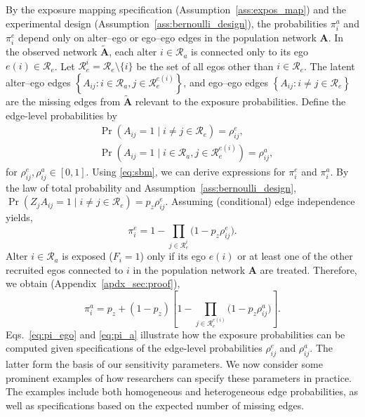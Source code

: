 \documentclass[11pt]{article}
\theoremstyle{definition}
\def \bA {\boldsymbol{A}}
\def \cR {\mathcal{R}}
\begin{document}
By the exposure mapping specification (Assumption~\ref{ass:expos_map}) and 
the experimental design (Assumption~\ref{ass:bernoulli_design}),
the probabilities $\pi_i^a$ and $\pi_i^e$ depend 
only on alter--ego or ego--ego edges in the population network $\bA$.
In the observed network $\widetilde{\bA}$, each alter $i \in \cR_a$ is connected only to its ego $e(i) \in \cR_e$.
Let $\cR_e^{i} = \cR_e \setminus \{i\}$ be the set of all egos other than $i \in \cR_e$.
The latent alter--ego edges $\left\{A_{ij} : i \in \cR_a, j \in \cR_e^{e(i)} \right\}$,
and ego--ego edges $\left\{A_{ij}: i \neq j \in \cR_e\right\}$ 
    are the missing edges from $\widetilde{\bA}$
    relevant to the exposure probabilities.
Define the edge-level probabilities by
\begin{equation}
    \label{eq:sbm}
    \begin{aligned}
    &\Pr\left(A_{ij}=1 \mid i \neq j \in\cR_e\right) = \rho^e_{ij},
    \\ 
    &\Pr\left(A_{ij}=1 \mid i \in \cR_a, j \in \cR_e^{e(i)} \right) = \rho^a_{ij},
    \end{aligned}
\end{equation}
for $\rho^e_{ij}, \rho^a_{ij} \in [0,1]$.
Using \eqref{eq:sbm}, we can derive expressions for $\pi^e_i$ and $\pi^a_i$.
By the law of total probability and Assumption~\ref{ass:bernoulli_design},
 $\Pr\left(Z_jA_{ij} = 1 \mid i\neq j \in \cR_e\right) =
    p_z\rho^e_{ij}$.
Assuming (conditional) edge independence yields,
\begin{equation}
    \label{eq:pi_ego}
    \pi^e_i = 1 - \prod_{j \in  \cR_e^i}
    \big(1 - p_z \rho^e_{ij}\big).
\end{equation}
Alter $i\in\cR_a$ is exposed ($F_i=1$) only if its ego $e(i)$ or at least one of the other recruited 
    egos connected to $i$ in the population network $\bA$ are treated.
    Therefore, we obtain (Appendix~\ref{apdx_sec:proof}),
\begin{equation}
    \label{eq:pi_a}
    \pi^a_i = p_z + 
    (1-p_z)
    \left[1- \prod_{j \in  \cR_e^{e(i)}}
    \big(1 - p_z \rho^a_{ij}\big)\right].
\end{equation}
Eqs.~\eqref{eq:pi_ego} and \eqref{eq:pi_a} illustrate how the exposure probabilities 
can be computed given specifications of the edge-level probabilities $\rho^e_{ij}$ and $\rho^a_{ij}$.
The latter form the basis of our sensitivity parameters.
We now consider some prominent examples of how researchers can specify these parameters in practice.
The examples include both homogeneous and heterogeneous edge probabilities,
as well as specifications based on the expected number of missing edges.  
\end{document}
